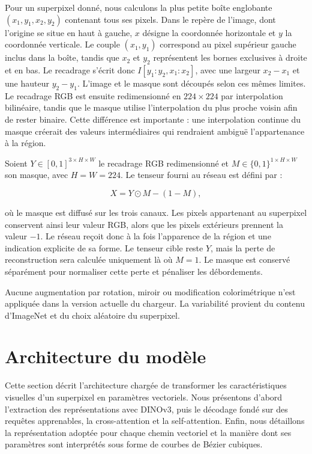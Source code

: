 \documentclass[12pt, a4paper, oneside]{report}
\begin{document}
Pour un superpixel donné, nous calculons la plus petite boîte englobante $(x_1,y_1,x_2,y_2)$ contenant tous ses pixels. Dans le repère de l'image, dont l'origine se situe en haut à gauche, $x$ désigne la coordonnée horizontale et $y$ la coordonnée verticale. Le couple $(x_1,y_1)$ correspond au pixel supérieur gauche inclus dans la boîte, tandis que $x_2$ et $y_2$ représentent les bornes exclusives à droite et en bas. Le recadrage s'écrit donc $I[y_1:y_2,x_1:x_2]$, avec une largeur $x_2-x_1$ et une hauteur $y_2-y_1$. L'image et le masque sont découpés selon ces mêmes limites. Le recadrage RGB est ensuite redimensionné en $224 \times 224$ par interpolation bilinéaire, tandis que le masque utilise l'interpolation du plus proche voisin afin de rester binaire. Cette différence est importante : une interpolation continue du masque créerait des valeurs intermédiaires qui rendraient ambiguë l'appartenance à la région.

Soient $Y \in [0,1]^{3 \times H \times W}$ le recadrage RGB redimensionné et $M \in \{0,1\}^{1 \times H \times W}$ son masque, avec $H=W=224$. Le tenseur fourni au réseau est défini par :

\begin{equation}
    X = Y \odot M - (1-M),
    \label{eq:entree_region}
\end{equation}

où le masque est diffusé sur les trois canaux. Les pixels appartenant au superpixel conservent ainsi leur valeur RGB, alors que les pixels extérieurs prennent la valeur $-1$. Le réseau reçoit donc à la fois l'apparence de la région et une indication explicite de sa forme. Le tenseur cible reste $Y$, mais la perte de reconstruction sera calculée uniquement là où $M=1$. Le masque est conservé séparément pour normaliser cette perte et pénaliser les débordements.

Aucune augmentation par rotation, miroir ou modification colorimétrique n'est appliquée dans la version actuelle du chargeur. La variabilité provient du contenu d'ImageNet et du choix aléatoire du superpixel.

\section{Architecture du modèle}
\label{sec:architecture_modele_propose}

Cette section décrit l'architecture chargée de transformer les caractéristiques visuelles d'un superpixel en paramètres vectoriels. Nous présentons d'abord l'extraction des représentations avec DINOv3, puis le décodage fondé sur des requêtes apprenables, la cross-attention et la self-attention. Enfin, nous détaillons la représentation adoptée pour chaque chemin vectoriel et la manière dont ses paramètres sont interprétés sous forme de courbes de Bézier cubiques.
\end{document}
